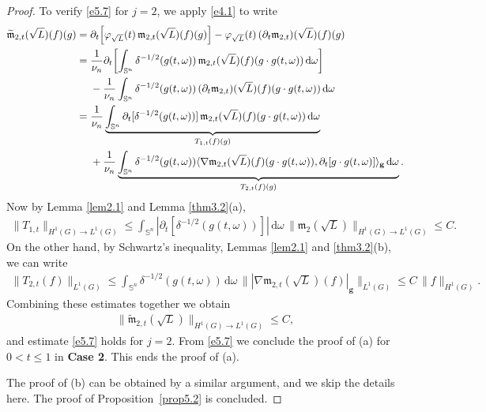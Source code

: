 \documentclass[a4paper,12pt]{amsart}
\numberwithin{equation}{section}
\theoremstyle{definition}
\theoremstyle{remark}
\numberwithin{theorem}{section}
\renewcommand{\SS}{\mathbb{S}}
\renewcommand{\d}{\mathrm{d}}
\begin{document}
\begin{proof}
To verify \eqref{e5.7} for $j=2$, we apply \eqref{e4.1} to write
\begin{align*}
\widetilde{\mathfrak{m}}_{2,t}(\sqrt{L})(f)(g)={}&\partial_t\!\left[\varphi_{\sqrt{L}}(t)\,\mathfrak{m}_{2,t}(\sqrt{L})(f)(g)\right]-\varphi_{\sqrt{L}}(t)\,(\partial_t\mathfrak{m}_{2,t})(\sqrt{L})(f)(g)\\
={}&{1\over\nu_n}\partial_t\!\left[\int_{\SS^n}\delta^{-1/2}(g(t,\omega))\,\mathfrak{m}_{2,t}(\sqrt{L})(f)(g\cdot g(t,\omega))\,\d\omega\right]\\
{}&-{1\over\nu_n}\int_{\SS^n}\delta^{-1/2}(g(t,\omega))\,(\partial_t\mathfrak{m}_{2,t})(\sqrt{L})(f)(g\cdot g(t,\omega))\,\d\omega\\
={}&{1\over\nu_n}\underbrace{\int_{\SS^n}\partial_t[\delta^{-1/2}(g(t,\omega))]\,\mathfrak{m}_{2,t}(\sqrt{L})(f)(g\cdot g(t,\omega))\,\d\omega}_{T_{1,t}(f)(g)}\\
{}&+{1\over\nu_n}\underbrace{\int_{\SS^n}\delta^{-1/2}(g(t,\omega))\langle\nabla \mathfrak{m}_{2,t}(\sqrt{L})(f)(g\cdot g(t,\omega)),\partial_t[g\cdot g(t,\omega)]\rangle_{\mathbf{g}}\,\d \omega}_{T_{2,t}(f)(g)}.
\end{align*}
Now by Lemma \ref{lem2.1} and Lemma \ref{thm3.2}(a),
\begin{align*}
\|T_{1,t}\|_{H^1(G)\to L^1(G)}\leq\int_{\SS^n}|\partial_t[\delta^{-1/2}(g(t,\omega))]|\,\d\omega\,\|\mathfrak{m}_2(\sqrt{L})\|_{H^1(G)\to L^1(G)}\leq C.
\end{align*}
On the other hand, by Schwartz's inequality, Lemmas \ref{lem2.1} and \ref{thm3.2}(b), we can write
\begin{align*}
\|T_{2,t}(f)\|_{L^1(G)}\leq \int_{\SS^n}\delta^{-1/2}(g(t,\omega))\,\d \omega\,\||\nabla\mathfrak{m}_{2,t}(\sqrt{L})(f)|_{\mathbf{g}}\|_{L^1(G)}\leq C\,\|f\|_{H^1(G)}.
\end{align*}
Combining these estimates together we obtain
\begin{align*}
\|\widetilde{\mathfrak{m}}_{2,t}(\sqrt{L})\|_{H^1(G)\to L^1(G)}\leq C,
\end{align*}
and estimate \eqref{e5.7} holds for $j=2$. From \eqref{e5.7} we conclude the proof of (a) for $0<t\leq 1$ in \textbf{Case 2}. This ends the proof of (a).

The proof of (b) can be obtained by a similar argument, and we skip the details here. The proof of Proposition~\ref{prop5.2} is concluded.
\end{proof}
\end{document}
